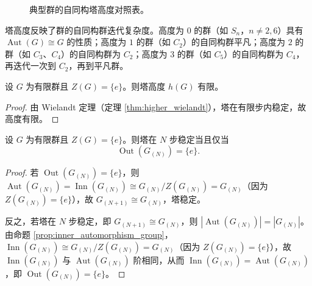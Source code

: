 \begin{figure}[htbp]
\centering
{}
\caption{典型群的自同构塔高度对照表。}
\label{fig:tower_heights}
\end{figure}

\begin{remark}[塔高度与群结构的关系]\label{rem:tower_height_structure}
塔高度反映了群的自同构群迭代复杂度。高度为 $0$ 的群（如 $S_n$，$n\neq 2,6$）具有 $\operatorname{Aut}(G)\cong G$ 的性质；高度为 $1$ 的群（如 $C_2$）的自同构群平凡；高度为 $2$ 的群（如 $C_3$、$C_4$）的自同构群为 $C_2$；高度为 $3$ 的群（如 $C_5$）的自同构群为 $C_4$，再迭代一次到 $C_2$，再到平凡群。
\end{remark}

\begin{lemma}[塔高度的有限性]\label{lem:tower_height_finite}
设 $G$ 为有限群且 $Z(G)=\{e\}$。则塔高度 $h(G)$ 有限。
\end{lemma}

\begin{proof}
由 Wielandt 定理（定理 \ref{thm:higher_wielandt}），塔在有限步内稳定，故高度有限。
\end{proof}

\begin{theorem}[塔稳定性的等价条件]\label{thm:tower_stability_periodic}
设 $G$ 为有限群且 $Z(G)=\{e\}$。则塔在 $N$ 步稳定当且仅当
\[
\operatorname{Out}(G_{(N)}) = \{e\}.
\]
\end{theorem}

\begin{proof}
若 $\operatorname{Out}(G_{(N)}) = \{e\}$，则 $\operatorname{Aut}(G_{(N)}) = \operatorname{Inn}(G_{(N)}) \cong G_{(N)}/Z(G_{(N)}) = G_{(N)}$（因为 $Z(G_{(N)})=\{e\}$），故 $G_{(N+1)} \cong G_{(N)}$，塔稳定。

反之，若塔在 $N$ 步稳定，即 $G_{(N+1)} \cong G_{(N)}$，则 $|\operatorname{Aut}(G_{(N)})| = |G_{(N)}|$。由命题 \ref{prop:inner_automorphism_group}，$\operatorname{Inn}(G_{(N)}) \cong G_{(N)}/Z(G_{(N)}) = G_{(N)}$（因为 $Z(G_{(N)})=\{e\}$），故 $\operatorname{Inn}(G_{(N)})$ 与 $\operatorname{Aut}(G_{(N)})$ 阶相同，从而 $\operatorname{Inn}(G_{(N)}) = \operatorname{Aut}(G_{(N)})$，即 $\operatorname{Out}(G_{(N)}) = \{e\}$。
\end{proof}

